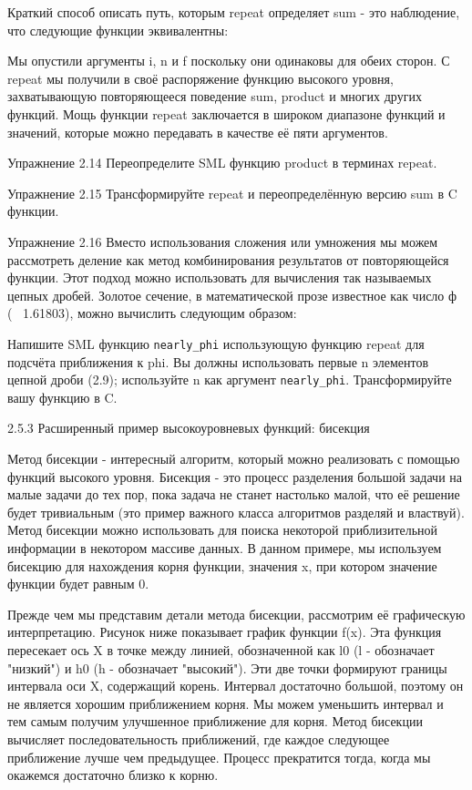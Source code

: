 Краткий способ описать путь, которым repeat определяет sum - это наблюдение, что следующие функции эквивалентны:

Мы опустили аргументы i, n и f поскольку они одинаковы для обеих сторон. С repeat мы получили в своё распоряжение функцию высокого уровня, захватывающую повторяющееся поведение sum, product и многих других функций. Мощь функции repeat заключается в широком диапазоне функций и значений, которые можно передавать в качестве её пяти аргументов.

Упражнение 2.14 Переопределите SML функцию product в терминах repeat.

Упражнение 2.15 Трансформируйте repeat и переопределённую версию sum в C функции.

Упражнение 2.16 Вместо использования сложения или умножения мы можем рассмотреть деление как метод комбинирования результатов от повторяющейся функции. Этот подход можно использовать для вычисления так называемых цепных дробей. Золотое сечение, в математической прозе известное как число ф (~ 1.61803), можно вычислить следующим образом:

Напишите SML функцию \lstinline|nearly_phi| использующую функцию repeat для подсчёта приближения к phi. Вы должны использовать первые n элементов цепной дроби (2.9); используйте n как аргумент \lstinline|nearly_phi|. Трансформируйте вашу функцию в C.

2.5.3 Расширенный пример высокоуровневых функций: бисекция

Метод бисекции - интересный алгоритм, который можно реализовать с помощью функций высокого уровня. Бисекция - это процесс разделения большой задачи на малые задачи до тех пор, пока задача не станет настолько малой, что её решение будет тривиальным (это пример важного класса алгоритмов разделяй и властвуй). Метод бисекции можно использовать для поиска некоторой приблизительной информации в некотором массиве данных. В данном примере, мы используем бисекцию для нахождения корня функции, значения x, при котором значение функции будет равным 0.

Прежде чем мы представим детали метода бисекции, рассмотрим её графическую интерпретацию. Рисунок ниже показывает график функции f(x). Эта функция пересекает ось X в точке между линией, обозначенной как l0 (l - обозначает "низкий") и h0 (h - обозначает "высокий"). Эти две точки формируют границы интервала оси X, содержащий корень. Интервал достаточно большой, поэтому он не является хорошим приближением корня. Мы можем уменьшить интервал и тем самым получим улучшенное приближение для корня. Метод бисекции вычисляет последовательность приближений, где каждое следующее приближение лучше чем предыдущее. Процесс прекратится тогда, когда мы окажемся достаточно близко к корню.

